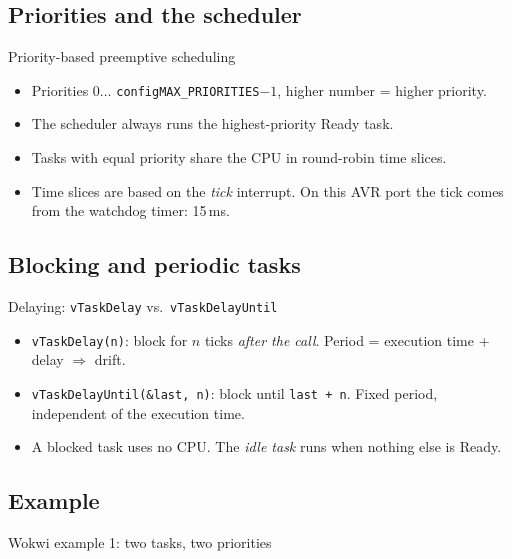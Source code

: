 \subsection{Priorities and the scheduler}
\begin{frame}{Priority-based preemptive scheduling}
  \begin{itemize}
    \item Priorities $0 \dots$ \texttt{configMAX\_PRIORITIES}$-1$, higher number = higher priority.
    \item The scheduler always runs the highest-priority Ready task.
    \item Tasks with equal priority share the CPU in round-robin time slices.
    \item Time slices are based on the \emph{tick} interrupt. On this AVR port the tick comes from the watchdog timer: 15\,ms.
  \end{itemize}
\end{frame}


\subsection{Blocking and periodic tasks}
\begin{frame}{Delaying: \texttt{vTaskDelay} vs.\ \texttt{vTaskDelayUntil}}
  \begin{itemize}
    \item \texttt{vTaskDelay(n)}: block for $n$ ticks \emph{after the call}. Period = execution time + delay $\Rightarrow$ drift.
    \item \texttt{vTaskDelayUntil(\&last, n)}: block until \texttt{last + n}. Fixed period, independent of the execution time.
    \item A blocked task uses no CPU. The \emph{idle task} runs when nothing else is Ready.
  \end{itemize}
\end{frame}

\subsection{Example}
\begin{frame}[fragile]{Wokwi example 1: two tasks, two priorities}
\end{frame}

